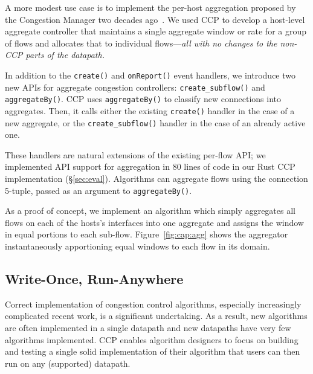 A more modest use case is to implement the per-host aggregation proposed by the
Congestion Manager two decades ago~\cite{cm}. We used CCP to develop a
host-level aggregate controller that maintains a single aggregate window or rate
for a group of flows and allocates that to individual flows---{\em all with no
  changes to the non-CCP parts of the datapath.}

%

 In addition to the \texttt{create()} and \texttt{onReport()} event handlers, we introduce two new APIs for aggregate congestion controllers: \texttt{create\_subflow()} and \texttt{aggregateBy()}.
CCP uses \texttt{aggregateBy()} to classify new connections into aggregates. Then, it calls either the existing \texttt{create()} handler in the case of a new aggregate, or the \texttt{create\_subflow()} handler in the case of an already active one.

These handlers are natural extensions of the existing per-flow API; we implemented API support for aggregation in $80$ lines of code in our Rust CCP implementation (\S\ref{sec:eval}).
Algorithms can aggregate flows using the connection 5-tuple, passed as an argument to \texttt{aggregateBy()}.

As a proof of concept, we implement an algorithm which simply aggregates all flows on each of the hosts's interfaces into one aggregate and assigns the window in equal portions to each sub-flow.
Figure~\ref{fig:cap:agg} shows the aggregator instantaneously apportioning equal windows to each flow in its domain.

 
\subsection{Write-Once, Run-Anywhere}
\label{s:capabilities:wora}
\label{s:datapaths:eval}

Correct implementation of congestion control algorithms, especially increasingly complicated recent work, is a significant undertaking.
As a result, new algorithms are often implemented in a single datapath and new datapaths have very few algorithms implemented. 
CCP enables algorithm designers to focus on building and testing a single solid implementation of their algorithm that users can then run on any (supported) datapath. 

